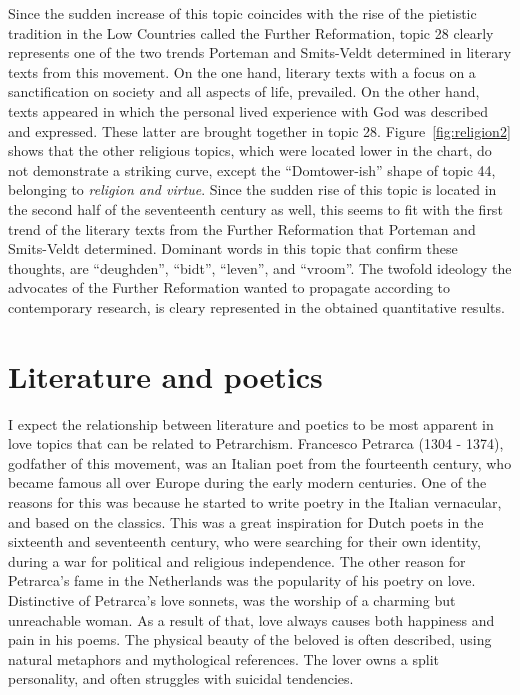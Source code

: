 Since the sudden increase of this topic coincides with the rise of the pietistic tradition in the Low Countries called the Further Reformation, topic 28 clearly represents one of the two trends Porteman and Smits-Veldt determined in literary texts from this movement. On the one hand, literary texts with a focus on a sanctification on society and all aspects of life, prevailed. On the other hand, texts appeared in which the personal lived experience with God was described and expressed. These latter are brought together in topic 28. Figure~\ref{fig:religion2} shows that the other religious topics, which were located lower in the chart, do not demonstrate a striking curve, except the \enquote{Domtower-ish} shape of topic 44, belonging to \textit{religion and virtue}. Since the sudden rise of this topic is located in the second half of the seventeenth century as well, this seems to fit with the first trend of the literary texts from the Further Reformation that Porteman and Smits-Veldt determined. \autocite[658]{porteman_een_2009} Dominant words in this topic that confirm these thoughts, are \enquote{deughden}, \enquote{bidt}, \enquote{leven}, and \enquote{vroom}. The twofold ideology the advocates of the Further Reformation wanted to propagate according to contemporary research, is cleary represented in the obtained quantitative results.

\section{Literature and poetics}
I expect the relationship between literature and poetics to be most apparent in love topics that can be related to Petrarchism. Francesco Petrarca (1304 - 1374), godfather of this movement, was an Italian poet from the fourteenth century, who became famous all over Europe during the early modern centuries. One of the reasons for this was because he started to write poetry in the Italian vernacular, and based on the classics. This was a great inspiration for Dutch poets in the sixteenth and seventeenth century, who were searching for their own identity, during a war for political and religious independence.\autocite[17]{porteman_een_2009} The other reason for Petrarca's fame in the Netherlands was the popularity of his poetry on love. Distinctive of Petrarca's love sonnets, was the worship of a charming but unreachable woman. As a result of that, love always causes both happiness and pain in his poems. The physical beauty of the beloved is often described, using natural metaphors and mythological references. The lover owns a split personality, and often struggles with suicidal tendencies.\autocite{bork_algemeen_2012} 

